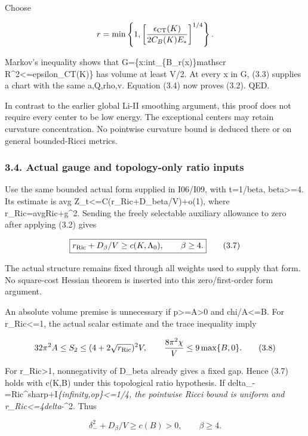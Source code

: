 \documentclass[
  10pt,
]{article}
\begin{document}
Choose

\[
 r=\min\left\{1,
    \left[\frac{\epsilon_{\rm CT}(K)}{2C_B(K)E_*}\right]^{1/4}\right\}.
\]

Markov's inequality shows that G=\{x:int\_\{B\_r(x)\}\textbar mathscr
R\textbar\^{}2\textless=epsilon\_CT(K)\} has volume at least V/2. At
every x in G, (3.3) supplies a chart with the same a,Q,rho,v. Equation
(3.4) now proves (3.2). QED.

In contrast to the earlier global Li-II smoothing argument, this proof
does not require every center to be low energy. The exceptional centers
may retain curvature concentration. No pointwise curvature bound is
deduced there or on general bounded-Ricci metrics.

\hypertarget{actual-gauge-and-topology-only-ratio-inputs}{%
\subsubsection{3.4. Actual gauge and topology-only ratio
inputs}\label{actual-gauge-and-topology-only-ratio-inputs}}

Use the same bounded actual form supplied in I06/I09, with t=1/beta,
beta\textgreater=4. Its estimate is avg
Z\_t\textless=C(r\_Ric+D\_beta/V)+o(1), where
r\_Ric=avg\textbar Ric+g\textbar\^{}2. Sending the freely selectable
auxiliary allowance to zero after applying (3.2) gives

\[
 \boxed{r_{\rm Ric}+D_\beta/V\ge c(K,\Lambda_0),
                           \qquad\beta\ge4.}         \tag{3.7}
\]

The actual structure remains fixed through all weights used to supply
that form. No square-cost Hessian theorem is inserted into this
zero/first-order form argument.

An absolute volume premise is unnecessary if
p\textgreater=A\textgreater0 and chi/A\textless=B. For
r\_Ric\textless=1, the actual scalar estimate and the trace inequality
imply

\[
 32\pi^2A\le S_2\le (4+2\sqrt{r_{\rm Ric}})^2V,
 \qquad \frac{8\pi^2\chi}{V}\le9\max\{B,0\}.        \tag{3.8}
\]

For r\_Ric\textgreater1, nonnegativity of D\_beta already gives a fixed
gap. Hence (3.7) holds with c(K,B) under this topological ratio
hypothesis. If
delta\_-=\textbar\textbar Ric\^{}sharp+I\textbar\textbar{}\emph{\{infinity,op\}\textless=1/4,
the pointwise Ricci bound is uniform and r\_Ric\textless=4delta}-\^{}2.
Thus

\[
 \boxed{\delta_-^2+D_\beta/V\ge c(B)>0,
                              \qquad\beta\ge4.}      \tag{3.9}
\]
\end{document}
